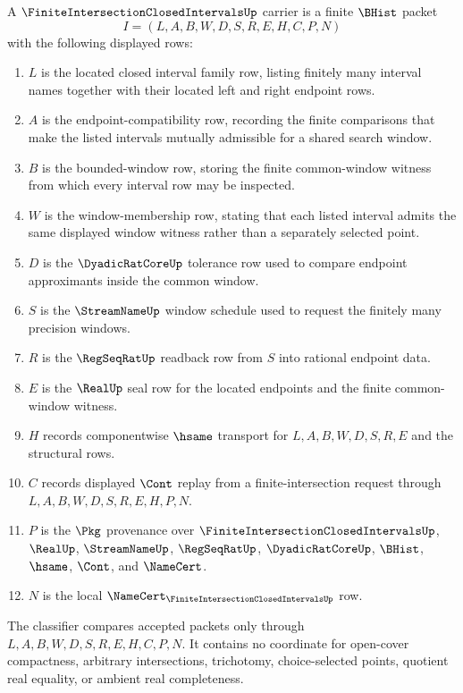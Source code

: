 \begin{definition}
\label{def:finite-intersection-closed-intervals-carrier}
A $\FiniteIntersectionClosedIntervalsUp$ carrier is a finite $\BHist$ packet
$$
I=(L,A,B,W,D,S,R,E,H,C,P,N)
$$
with the following displayed rows:
\begin{enumerate}
\item $L$ is the located closed interval family row, listing finitely many interval names together with their located left and right endpoint rows.
\item $A$ is the endpoint-compatibility row, recording the finite comparisons that make the listed intervals mutually admissible for a shared search window.
\item $B$ is the bounded-window row, storing the finite common-window witness from which every interval row may be inspected.
\item $W$ is the window-membership row, stating that each listed interval admits the same displayed window witness rather than a separately selected point.
\item $D$ is the $\DyadicRatCoreUp$ tolerance row used to compare endpoint approximants inside the common window.
\item $S$ is the $\StreamNameUp$ window schedule used to request the finitely many precision windows.
\item $R$ is the $\RegSeqRatUp$ readback row from $S$ into rational endpoint data.
\item $E$ is the $\RealUp$ seal row for the located endpoints and the finite common-window witness.
\item $H$ records componentwise $\hsame$ transport for $L,A,B,W,D,S,R,E$ and the structural rows.
\item $C$ records displayed $\Cont$ replay from a finite-intersection request through $L,A,B,W,D,S,R,E,H,P,N$.
\item $P$ is the $\Pkg$ provenance over $\FiniteIntersectionClosedIntervalsUp$, $\RealUp$, $\StreamNameUp$, $\RegSeqRatUp$, $\DyadicRatCoreUp$, $\BHist$, $\hsame$, $\Cont$, and $\NameCert$.
\item $N$ is the local $\NameCert_{\FiniteIntersectionClosedIntervalsUp}$ row.
\end{enumerate}
The classifier compares accepted packets only through $L,A,B,W,D,S,R,E,H,C,P,N$. It contains no coordinate for open-cover compactness, arbitrary intersections, trichotomy, choice-selected points, quotient real equality, or ambient real completeness.
\end{definition}

